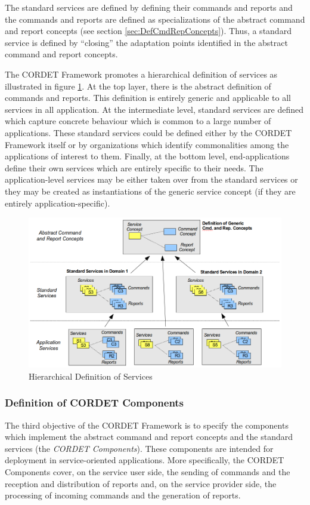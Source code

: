 \documentclass[a4paper,10pt]{article}
\begin{document}
The standard services are defined by defining their commands and reports and the commands and reports are defined as specializations of the abstract command and report concepts (see section \ref{sec:DefCmdRepConcepts}). 
Thus, a standard service is defined by “closing” the adaptation points identified in the abstract command and report concepts.

The CORDET Framework promotes a hierarchical definition of services as illustrated in figure \ref{fig:HierarchicalDefServ}. 
At the top layer, there is the abstract definition of commands and reports. 
This definition is entirely generic and applicable to all services in all application. 
At the intermediate level, standard services are defined which capture concrete behaviour which is common to a large number of applications. 
These standard services could be defined either by the CORDET Framework itself or by organizations which identify commonalities among the applications of interest to them. 
Finally, at the bottom level, end-applications define their own services which are entirely specific to their needs. 
The application-level services may be either taken over from the standard services or they may be created as instantiations of the generic service concept (if they are entirely application-specific).

\begin{figure}[ht]
 \centering
 \includegraphics[scale=0.3,keepaspectratio=true]{HierarchicalDefServ.png}
 \caption{Hierarchical Definition of Services}
 \label{fig:HierarchicalDefServ}
\end{figure}


\subsubsection{Definition of CORDET Components}\label{sec:crComponents}
The third objective of the CORDET Framework is to specify the components which implement the abstract command and report concepts and the standard services (the \textit{CORDET Components}). These components are intended for deployment in service-oriented applications. More specifically, the CORDET Components cover, on the service user side, the sending of commands and the reception and distribution of reports and, on the service provider side, the processing of incoming commands and the generation of reports.
\end{document}
